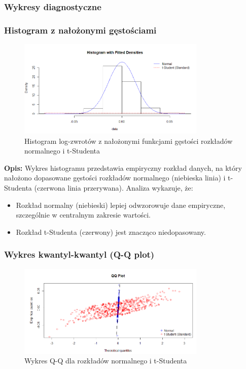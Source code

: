 \documentclass[a4paper,11pt]{article}
\begin{document}
\subsubsection{Wykresy diagnostyczne}

\subsubsection{Histogram z nałożonymi gęstościami}

\begin{figure}[H]
    \centering
    \includegraphics[width=0.8\textwidth]{./Wojtek/histogram-z-gestosciami.png}
    \caption{Histogram log-zwrotów z nałożonymi funkcjami gęstości rozkładów normalnego i t-Studenta}
    \label{fig:histogram_gestosci}
\end{figure}

\textbf{Opis:} Wykres histogramu przedstawia empiryczny rozkład danych, na który nałożono dopasowane gęstości rozkładów normalnego (niebieska linia) i t-Studenta (czerwona linia przerywana).  
Analiza wykazuje, że:
\begin{itemize}
    \item Rozkład normalny (niebieski) lepiej odwzorowuje dane empiryczne, szczególnie w centralnym zakresie wartości.
    \item Rozkład t-Studenta (czerwony) jest znacząco niedopasowany.
\end{itemize}

\subsubsection{Wykres kwantyl-kwantyl (Q-Q plot)}

\begin{figure}[H]
    \centering
    \includegraphics[width=0.8\textwidth]{./Wojtek/wykres-kwantyl-kwantyl.png}
    \caption{Wykres Q-Q dla rozkładów normalnego i t-Studenta}
    \label{fig:qq_plot}
\end{figure}
\end{document}
